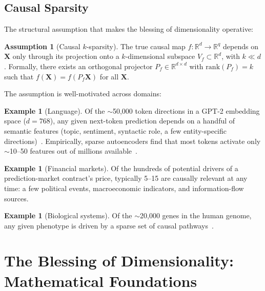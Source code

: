 \documentclass[11pt,a4paper]{article}
\theoremstyle{plain}
\theoremstyle{definition}
\newtheorem{assumption}[theorem]{Assumption}
\newtheorem{example}[theorem]{Example}
\theoremstyle{remark}
\newcommand{\R}{\mathbb{R}}
\newcommand{\rank}{\mathrm{rank}}
\begin{document}
\subsection{Causal Sparsity}\label{sec:sparsity}

The structural assumption that makes the blessing of dimensionality operative:

\begin{assumption}[Causal $k$-sparsity]\label{ass:sparsity}
The true causal map $f:\R^d \to \R^q$ depends on $\mathbf{X}$ only through its
projection onto a $k$-dimensional subspace $V_f \subset \R^d$, with $k \ll d$.
Formally, there exists an orthogonal projector $P_f \in \R^{d\times d}$ with
$\rank(P_f) = k$ such that $f(\mathbf{X}) = f(P_f \mathbf{X})$ for all
$\mathbf{X}$.
\end{assumption}

The assumption is well-motivated across domains:

\begin{example}[Language]
Of the $\sim$50{,}000 token directions in a GPT-2 embedding space ($d = 768$),
any given next-token prediction depends on a handful of semantic features
(topic, sentiment, syntactic role, a few entity-specific
directions)~\citep{park2024linear, bricken2023monosemanticity}.  Empirically,
sparse autoencoders find that most tokens activate only $\sim$10--50 features
out of millions available~\citep{templeton2024scaling}.
\end{example}

\begin{example}[Financial markets]
Of the hundreds of potential drivers of a prediction-market contract's price,
typically 5--15 are causally relevant at any time: a few political events,
macroeconomic indicators, and information-flow sources.
\end{example}

\begin{example}[Biological systems]
Of the $\sim$20{,}000 genes in the human genome, any given phenotype is driven
by a sparse set of causal pathways~\citep{boyle2017expanded}.
\end{example}


\section{The Blessing of Dimensionality: Mathematical Foundations}%
\label{sec:blessing}
\end{document}
